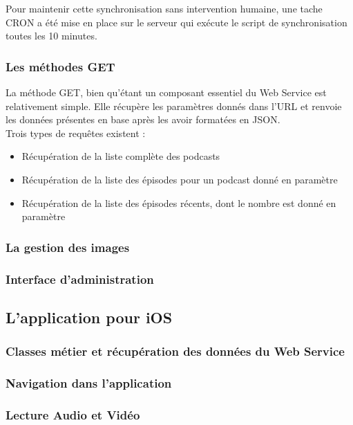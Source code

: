 \documentclass[11pt, french]{report}
\begin{document}
Pour maintenir cette synchronisation sans intervention humaine, une tache CRON a été mise en place sur le serveur qui exécute le script de synchronisation toutes les 10 minutes.

\subsubsection{Les méthodes GET}

La méthode GET, bien qu'étant un composant essentiel du Web Service est relativement simple. Elle récupère les paramètres donnés dans l'URL et renvoie les données présentes en base après les avoir formatées en JSON.\\

Trois types de requêtes existent :
\begin{itemize}
	\item Récupération de la liste complète des podcasts
	\item Récupération de la liste des épisodes pour un podcast donné en paramètre
	\item Récupération de la liste des épisodes récents, dont le nombre est donné en paramètre
\end{itemize}


\subsubsection{La gestion des images}

\subsubsection{Interface d'administration}




\subsection{L'application pour iOS}

\subsubsection{Classes métier et récupération des données du Web Service}

\subsubsection{Navigation dans l'application}

\subsubsection{Lecture Audio et Vidéo}
\end{document}
